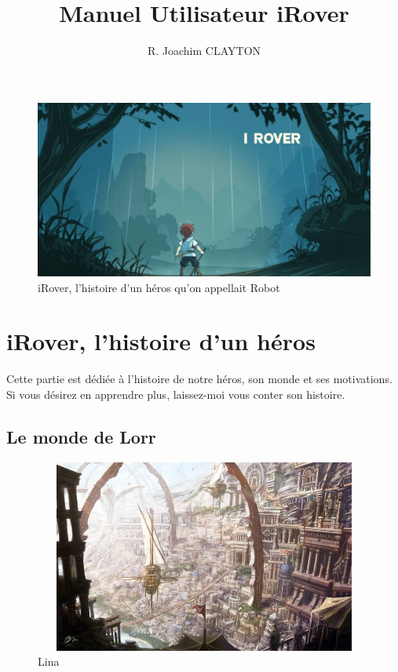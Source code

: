 \documentclass[a4paper 12pts]{article}
\title{Manuel Utilisateur iRover}
\author{R. Joachim CLAYTON}
\begin{document}
\maketitle


\begin{figure}[h]
   \includegraphics[width=350pt]{Illustration/proj_irover.jpg}
	\caption{iRover, l'histoire d'un héros qu'on appellait Robot}
\end{figure}



\newpage


\renewcommand{\contentsname}{Sommaire} 
\tableofcontents

\newpage



\section{iRover, l'histoire d'un héros}


\vspace{1cm}

Cette partie est dédiée à l'histoire de notre héros, son monde et ses motivations.
Si vous désirez en apprendre plus, laissez-moi vous conter son histoire.

\vspace{1cm}

\subsection{Le monde de Lorr}

\vspace{1cm}

\begin{figure}[h]
	\includegraphics[width=350pt, height=180pt]{Illustration/Lina.jpg}
	\caption{Lina}
\end{figure}
\end{document}
